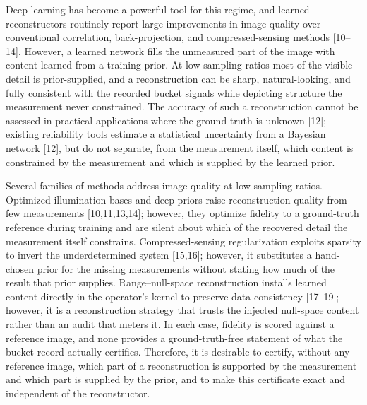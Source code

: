 \documentclass[11pt]{article}
\begin{document}
Deep learning has become a powerful tool for this regime, and learned reconstructors routinely report large improvements in image quality over conventional correlation, back-projection, and compressed-sensing methods [10--14]. However, a learned network fills the unmeasured part of the image with content learned from a training prior. At low sampling ratios most of the visible detail is prior-supplied, and a reconstruction can be sharp, natural-looking, and fully consistent with the recorded bucket signals while depicting structure the measurement never constrained. The accuracy of such a reconstruction cannot be assessed in practical applications where the ground truth is unknown [12]; existing reliability tools estimate a statistical uncertainty from a Bayesian network [12], but do not separate, from the measurement itself, which content is constrained by the measurement and which is supplied by the learned prior.

Several families of methods address image quality at low sampling ratios. Optimized illumination bases and deep priors raise reconstruction quality from few measurements [10,11,13,14]; however, they optimize fidelity to a ground-truth reference during training and are silent about which of the recovered detail the measurement itself constrains. Compressed-sensing regularization exploits sparsity to invert the underdetermined system [15,16]; however, it substitutes a hand-chosen prior for the missing measurements without stating how much of the result that prior supplies. Range--null-space reconstruction installs learned content directly in the operator's kernel to preserve data consistency [17--19]; however, it is a reconstruction strategy that trusts the injected null-space content rather than an audit that meters it. In each case, fidelity is scored against a reference image, and none provides a ground-truth-free statement of what the bucket record actually certifies. Therefore, it is desirable to certify, without any reference image, which part of a reconstruction is supported by the measurement and which part is supplied by the prior, and to make this certificate exact and independent of the reconstructor.
\end{document}
